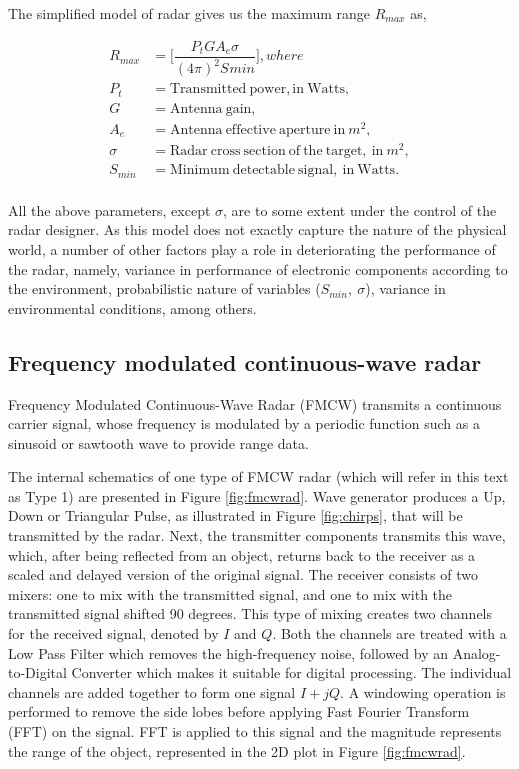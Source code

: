 The simplified model of radar gives us the maximum range $R_{max}$ as,

\begin{equation}\label{radmodel}
\begin{aligned}
R_{max}&=\bigg[ \dfrac{P_{t}GA_{e}\sigma}{(4\pi)^2S_{}min}\bigg],       where\\
P_{t} &= \mathrm{Transmitted\ power, in \ Watts,}\\
G &= \mathrm{Antenna\ gain},\\
A_{e} &= \mathrm{Antenna\  effective \ aperture \ in}\ m^2,\\
\sigma &= \mathrm{Radar \ cross \ section \ of \ the \ target,\ in} \ m^2, \\
S_{min} &= \mathrm{Minimum \ detectable \ signal, \ in \ Watts}.\\
\end{aligned}
\end{equation}




All the above parameters, except $\sigma$, are to some extent under the control of the radar designer. As this model does not exactly capture the nature of the physical world, a number of other factors play a role in deteriorating the performance of the radar, namely, variance in performance of electronic components according to the environment, probabilistic nature of variables ($S_{min},\  \sigma$), variance in environmental conditions, among others.

\subsection{Frequency modulated continuous-wave radar}
Frequency Modulated Continuous-Wave Radar (FMCW) transmits a continuous carrier signal, whose frequency is modulated by a periodic function such as a sinusoid or sawtooth wave to provide range data. 

The internal schematics of one type of FMCW radar (which will refer in this text as Type 1) are presented in Figure \ref{fig:fmcwrad}. Wave generator produces a Up, Down or Triangular Pulse, as illustrated in Figure \ref{fig:chirps}, that will be transmitted by the radar. Next, the transmitter components transmits this wave, which, after being reflected from an object, returns back to the receiver as a scaled and delayed version of the original signal. The receiver consists of two mixers: one to mix with the transmitted signal, and one to mix with the transmitted signal shifted 90 degrees. This type of mixing creates two channels for the received signal, denoted by $I$ and $Q$. Both the channels are treated with a Low Pass Filter which removes the high-frequency noise, followed by an Analog-to-Digital Converter which makes it suitable for digital processing. The individual channels are added together to form one signal $I+jQ$. A windowing operation is performed to remove the side lobes before applying Fast Fourier Transform (FFT) on the signal. FFT  is applied to this signal and the magnitude represents the range of the object, represented in the 2D plot in Figure \ref{fig:fmcwrad}. 
  

